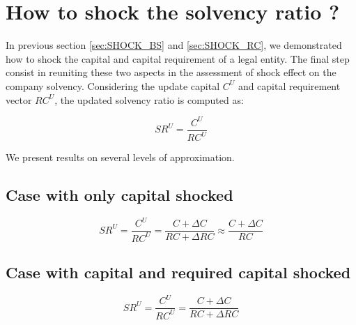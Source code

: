 \section{How to shock the solvency ratio ?}

In previous section \ref{sec:SHOCK_BS} and \ref{sec:SHOCK_RC}, we demonstrated how to shock the capital and capital requirement of a legal entity. The final step consist in reuniting these two aspects in the assessment of shock effect on the company solvency. Considering the update capital $C^U$ and capital requirement vector $RC^U$, the updated solvency ratio is computed as:

\begin{equation}
    SR^U = \frac{C^U}{RC^U}
\end{equation}

We present results on several levels of approximation.

\subsection{Case with only capital shocked}

\begin{equation}
    SR^U = \frac{C^U}{RC^U} = \frac{C + \Delta C}{RC + \Delta RC} \approx \frac{C + \Delta C}{RC}
\end{equation}

\subsection{Case with capital and required capital shocked}

\begin{equation}
    SR^U = \frac{C^U}{RC^U} = \frac{C + \Delta C}{RC + \Delta RC}
\end{equation}

